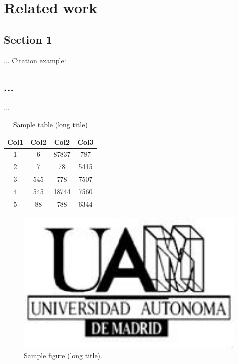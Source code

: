 
\chapter{Related work}
\label{cha:related-work}

\section{Section 1}
...
Citation example: \cite{SanMiguel15}
\section{...}
...
\begin{table}[]
 \begin{center}
 \caption[Sample table (short title)]{Sample table (long title)}
 \label{tab:sample-table}
 \begin{tabular}{||c c c c||} 
 \hline
 Col1 & Col2 & Col2 & Col3 \\ [0.5ex] 
 \hline\hline
 1 & 6 & 87837 & 787 \\ 
 \hline
 2 & 7 & 78 & 5415 \\
 \hline
 3 & 545 & 778 & 7507 \\
 \hline
 4 & 545 & 18744 & 7560 \\
 \hline
 5 & 88 & 788 & 6344 \\ [1ex] 
 \hline
\end{tabular}
\end{center}
\end{table}

\begin{figure}
\begin{centering}
\includegraphics[width=1\textwidth]{./img/logos/logoUAM_old.png}
\par\end{centering}
\caption[Sample figure (short title)]{Sample figure (long title).} 
\label{fig:sample-figure}
\end{figure}